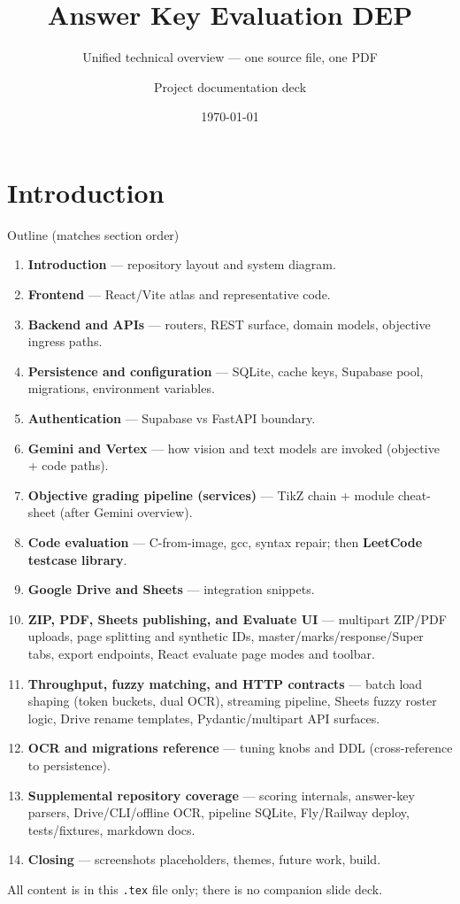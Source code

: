 \documentclass[aspectratio=169]{beamer}
\title[Presentation 3]{Answer Key Evaluation DEP}
\subtitle{Unified technical overview --- one source file, one PDF}
\author{Project documentation deck}
\date{\today}
\begin{document}
\begin{frame}\titlepage\end{frame}

\section{Introduction}

\begin{frame}{Outline (matches section order)}
  \small
  \begin{enumerate}
    \item \textbf{Introduction} --- repository layout and system diagram.
    \item \textbf{Frontend} --- React/Vite atlas and representative code.
    \item \textbf{Backend and APIs} --- routers, REST surface, domain models, objective ingress paths.
    \item \textbf{Persistence and configuration} --- SQLite, cache keys, Supabase pool, migrations, environment variables.
    \item \textbf{Authentication} --- Supabase vs FastAPI boundary.
    \item \textbf{Gemini and Vertex} --- how vision and text models are invoked (objective + code paths).
    \item \textbf{Objective grading pipeline (services)} --- TikZ chain + module cheat-sheet (after Gemini overview).
    \item \textbf{Code evaluation} --- C-from-image, gcc, syntax repair; then \textbf{LeetCode testcase library}.
    \item \textbf{Google Drive and Sheets} --- integration snippets.
    \item \textbf{ZIP, PDF, Sheets publishing, and Evaluate UI} --- multipart ZIP/PDF uploads, page splitting and synthetic IDs, master/marks/response/Super tabs, export endpoints, React evaluate page modes and toolbar.
    \item \textbf{Throughput, fuzzy matching, and HTTP contracts} --- batch load shaping (token buckets, dual OCR), streaming pipeline, Sheets fuzzy roster logic, Drive rename templates, Pydantic/multipart API surfaces.
    \item \textbf{OCR and migrations reference} --- tuning knobs and DDL (cross-reference to persistence).
    \item \textbf{Supplemental repository coverage} --- scoring internals, answer-key parsers, Drive/CLI/offline OCR, pipeline SQLite, Fly/Railway deploy, tests/fixtures, markdown docs.
    \item \textbf{Closing} --- screenshots placeholders, themes, future work, build.
  \end{enumerate}
  \vfill
  \footnotesize All content is in this \texttt{.tex} file only; there is no companion slide deck.
\end{frame}
\end{document}
